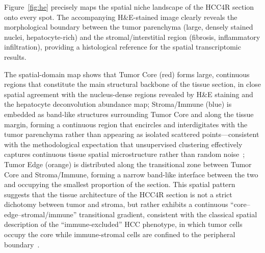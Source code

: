 \documentclass[12pt, a4paper]{article}
\begin{document}
Figure~\ref{fig:he} precisely maps the spatial niche landscape of the HCC4R section onto every spot. The accompanying H\&E-stained image clearly reveals the morphological boundary between the tumor parenchyma (large, densely stained nuclei, hepatocyte-rich) and the stromal/interstitial region (fibrosis, inflammatory infiltration), providing a histological reference for the spatial transcriptomic results.

The spatial-domain map shows that Tumor Core (red) forms large, continuous regions that constitute the main structural backbone of the tissue section, in close spatial agreement with the nucleus-dense regions revealed by H\&E staining and the hepatocyte deconvolution abundance map; Stroma/Immune (blue) is embedded as band-like structures surrounding Tumor Core and along the tissue margin, forming a continuous region that encircles and interdigitates with the tumor parenchyma rather than appearing as isolated scattered points—consistent with the methodological expectation that unsupervised clustering effectively captures continuous tissue spatial microstructure rather than random noise~\citep{schurch2020coordinated}; Tumor Edge (orange) is distributed along the transitional zone between Tumor Core and Stroma/Immune, forming a narrow band-like interface between the two and occupying the smallest proportion of the section. This spatial pattern suggests that the tissue architecture of the HCC4R section is not a strict dichotomy between tumor and stroma, but rather exhibits a continuous ``core--edge--stromal/immune'' transitional gradient, consistent with the classical spatial description of the ``immune-excluded'' HCC phenotype, in which tumor cells occupy the core while immune-stromal cells are confined to the peripheral boundary~\citep{llovet2021hepatocellular,binnewies2018understanding}.
\end{document}
